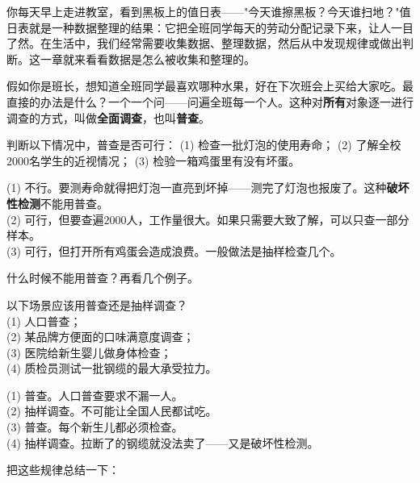 
你每天早上走进教室，看到黑板上的值日表——"今天谁擦黑板？今天谁扫地？"值日表就是一种数据整理的结果：它把全班同学每天的劳动分配记录下来，让人一目了然。在生活中，我们经常需要收集数据、整理数据，然后从中发现规律或做出判断。这一章就来看看数据是怎么被收集和整理的。


假如你是班长，想知道全班同学最喜欢哪种水果，好在下次班会上买给大家吃。最直接的办法是什么？一个一个问——问遍全班每一个人。这种对\textbf{所有}对象逐一进行调查的方式，叫做\textbf{全面调查}，也叫\textbf{普查}。

\begin{example}
判断以下情况中，普查是否可行：
(1) 检查一批灯泡的使用寿命；
(2) 了解全校$2000$名学生的近视情况；
(3) 检验一箱鸡蛋里有没有坏蛋。
\end{example}
\begin{solution}
(1) 不行。要测寿命就得把灯泡一直亮到坏掉——测完了灯泡也报废了。这种\textbf{破坏性检测}不能用普查。\\
(2) 可行，但要查遍$2000$人，工作量很大。如果只需要大致了解，可以只查一部分样本。\\
(3) 可行，但打开所有鸡蛋会造成浪费。一般做法是抽样检查几个。
\end{solution}

什么时候不能用普查？再看几个例子。

\begin{example}
以下场景应该用普查还是抽样调查？\\
(1) 人口普查；\\
(2) 某品牌方便面的口味满意度调查；\\
(3) 医院给新生婴儿做身体检查；\\
(4) 质检员测试一批钢缆的最大承受拉力。
\end{example}
\begin{solution}
(1) 普查。人口普查要求不漏一人。\\
(2) 抽样调查。不可能让全国人民都试吃。\\
(3) 普查。每个新生儿都必须检查。\\
(4) 抽样调查。拉断了的钢缆就没法卖了——又是破坏性检测。
\end{solution}

把这些规律总结一下：



